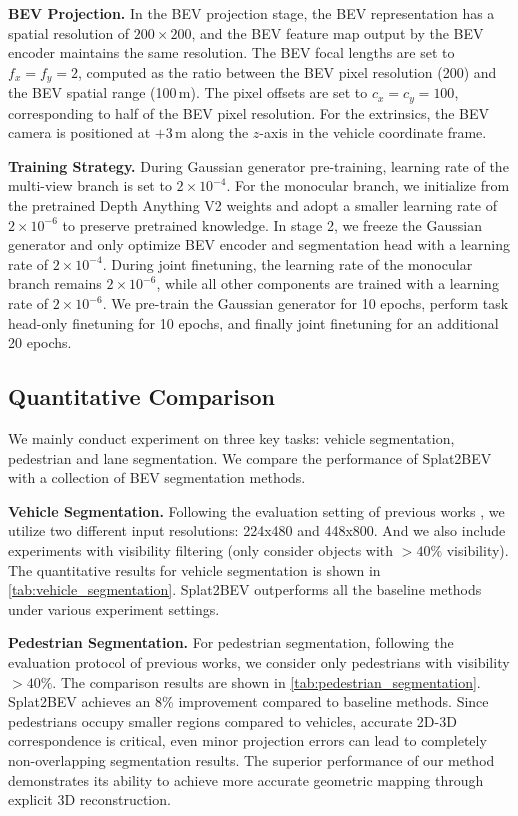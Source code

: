 \noindent\textbf{BEV Projection.}
In the BEV projection stage, 
the BEV representation has a spatial resolution of $200 \times 200$, and the BEV feature map output by the BEV encoder maintains the same resolution. 
The BEV focal lengths are set to $f_x = f_y = 2$, computed as the ratio between the BEV pixel resolution (200) and the BEV spatial range (100\,m). 
The pixel offsets are set to $c_x = c_y = 100$, corresponding to half of the BEV pixel resolution.
For the extrinsics, the BEV camera is positioned at $+3$\,m along the $z$-axis in the vehicle coordinate frame.

\noindent\textbf{Training Strategy.}
During Gaussian generator pre-training, learning rate of the multi-view branch is set to $2\times10^{-4}$.
For the monocular branch, we initialize from the pretrained Depth Anything V2 \cite{depth_anything_v2} weights and adopt a smaller learning rate of $2\times10^{-6}$ to preserve pretrained knowledge.
In stage 2, we freeze the Gaussian generator and only optimize BEV encoder and segmentation head with a learning rate of $2\times10^{-4}$.
During joint finetuning, the learning rate of the monocular branch remains $2\times10^{-6}$, while all other components are trained with a learning rate of $2\times10^{-6}$. 
We pre-train the Gaussian generator for 10 epochs, perform task head-only finetuning for 10 epochs, and finally joint finetuning for an additional 20 epochs.

\subsection{Quantitative Comparison}
We mainly conduct experiment on three key tasks: vehicle segmentation, pedestrian and lane segmentation. We compare the performance of Splat2BEV with a collection of BEV segmentation methods.

\noindent\textbf{Vehicle Segmentation.}
Following the evaluation setting of previous works \cite{chambon2024pointbev, kerbl20233d}, we utilize two different input resolutions: 224x480 and 448x800. 
And we also include experiments with visibility filtering (\ie only consider objects with $> 40\%$ visibility).
The quantitative results for vehicle segmentation is shown in \cref{tab:vehicle_segmentation}. 
Splat2BEV outperforms all the baseline methods under various experiment settings.


\noindent\textbf{Pedestrian Segmentation.}
For pedestrian segmentation, following the evaluation protocol of previous works, we consider only pedestrians with visibility $>40\%$.
The comparison results are shown in \cref{tab:pedestrian_segmentation}.
Splat2BEV achieves an 8\% improvement compared to baseline methods.
Since pedestrians occupy smaller regions compared to vehicles, accurate 2D-3D correspondence is critical, even minor projection errors can lead to completely non-overlapping segmentation results.
The superior performance of our method demonstrates its ability to achieve more accurate geometric mapping through explicit 3D reconstruction.
% 

